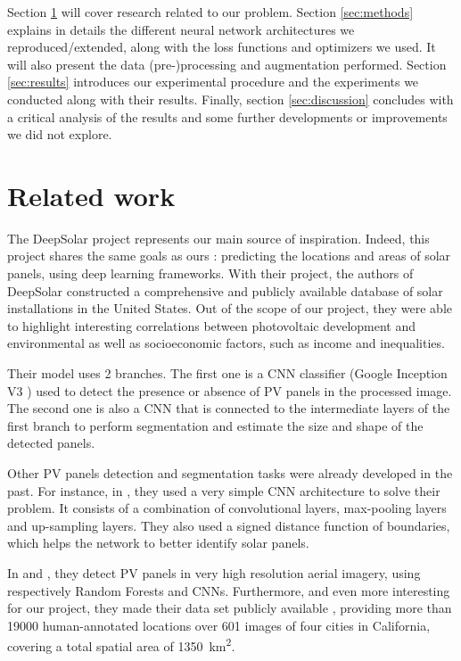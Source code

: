 \documentclass[twocolumn,superscriptaddress,aps,nofootinbib]{revtex4-1}
\begin{document}
Section \ref{sec:related_work} will cover research related to our problem. Section \ref{sec:methods} explains in details the different neural network architectures we reproduced/extended, along with the loss functions and optimizers we used. It will also present the data (pre-)processing and augmentation performed.
Section \ref{sec:results} introduces our experimental procedure and the experiments we conducted along with their results.
Finally, section \ref{sec:discussion} concludes with a critical analysis of the results and some further developments or improvements we did not explore.

\section{Related work}\label{sec:related_work}

The DeepSolar \cite{yu2018deepsolar} project represents our main source of inspiration. Indeed, this project shares the same goals as ours : predicting the locations and areas of solar panels, using deep learning frameworks. With their project, the authors of DeepSolar constructed a comprehensive and publicly available database of solar installations in the United States. Out of the scope of our project, they were able to highlight interesting correlations between photovoltaic development and environmental as well as socioeconomic factors, such as income and inequalities.

Their model uses 2 branches. The first one is a CNN classifier (Google Inception V3 \cite{szegedy2016rethinking}) used to detect the presence or absence of PV panels in the processed image. The second one is also a CNN that is connected to the intermediate layers of the first branch to perform segmentation and estimate the size and shape of the detected panels.

Other PV panels detection and segmentation tasks were already developed in the past. For instance, in \cite{yuan2016large}, they used a very simple CNN architecture to solve their problem. It consists of a combination of convolutional layers, max-pooling layers and up-sampling layers. They also used a signed distance function of boundaries, which helps the network to better identify solar panels.

In \cite{malof2016automatic} and \cite{malof2016deep}, they detect PV panels in very high resolution aerial imagery, using respectively Random Forests and CNNs. Furthermore, and even more interesting for our project, they made their data set publicly available \cite{bradbury2016distributed}, providing more than \num{19000} human-annotated locations over \num{601} images of four cities in California, covering a total spatial area of \SI{1350}{\kilo\meter\squared}.
\end{document}
